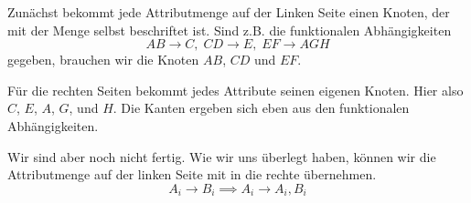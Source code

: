\documentclass[a4paper, ngerman]{article}
\begin{document}
Zunächst bekommt jede Attributmenge
auf der Linken Seite einen Knoten,
der mit der Menge selbst beschriftet ist.
Sind z.B. die funktionalen Abhängigkeiten
$$
    AB \to C,\;
    CD \to E,\;
    EF \to AGH
$$
gegeben, brauchen wir die Knoten $AB$, $CD$ und $EF$.
\begin{center}
\end{center}
Für die rechten Seiten bekommt
jedes Attribute seinen eigenen Knoten.
Hier also $C$, $E$, $A$, $G$, und $H$.
Die Kanten ergeben sich eben aus
den funktionalen Abhängigkeiten.
\begin{center}
\end{center}
Wir sind aber noch nicht fertig.
Wie wir uns überlegt haben,
können wir die Attributmenge
auf der linken Seite mit in die rechte übernehmen.
$$
    A_i \to B_i \implies
    A_i \to A_i, B_i 
$$
\end{document}
